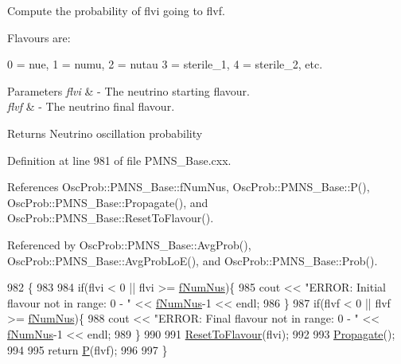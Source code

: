 Compute the probability of flvi going to flvf.

Flavours are\+: 
\begin{DoxyPre}
  0 = nue, 1 = numu, 2 = nutau
  3 = sterile\_1, 4 = sterile\_2, etc.
\end{DoxyPre}
 
\begin{DoxyParams}{Parameters}
{\em flvi} & -\/ The neutrino starting flavour. \\
\hline
{\em flvf} & -\/ The neutrino final flavour.\\
\hline
\end{DoxyParams}
\begin{DoxyReturn}{Returns}
Neutrino oscillation probability 
\end{DoxyReturn}


Definition at line 981 of file P\+M\+N\+S\+\_\+\+Base.\+cxx.



References Osc\+Prob\+::\+P\+M\+N\+S\+\_\+\+Base\+::f\+Num\+Nus, Osc\+Prob\+::\+P\+M\+N\+S\+\_\+\+Base\+::\+P(), Osc\+Prob\+::\+P\+M\+N\+S\+\_\+\+Base\+::\+Propagate(), and Osc\+Prob\+::\+P\+M\+N\+S\+\_\+\+Base\+::\+Reset\+To\+Flavour().



Referenced by Osc\+Prob\+::\+P\+M\+N\+S\+\_\+\+Base\+::\+Avg\+Prob(), Osc\+Prob\+::\+P\+M\+N\+S\+\_\+\+Base\+::\+Avg\+Prob\+Lo\+E(), and Osc\+Prob\+::\+P\+M\+N\+S\+\_\+\+Base\+::\+Prob().


\begin{DoxyCode}
982 \{
983 
984   \textcolor{keywordflow}{if}(flvi < 0 || flvi >= \hyperlink{classOscProb_1_1PMNS__Base_a24bb74bed63569dfe88b18fa6a08060e}{fNumNus})\{
985     cout << \textcolor{stringliteral}{"ERROR: Initial flavour not in range: 0 - "} << \hyperlink{classOscProb_1_1PMNS__Base_a24bb74bed63569dfe88b18fa6a08060e}{fNumNus}-1 << endl;
986   \}
987   \textcolor{keywordflow}{if}(flvf < 0 || flvf >= \hyperlink{classOscProb_1_1PMNS__Base_a24bb74bed63569dfe88b18fa6a08060e}{fNumNus})\{
988     cout << \textcolor{stringliteral}{"ERROR: Final flavour not in range: 0 - "} << \hyperlink{classOscProb_1_1PMNS__Base_a24bb74bed63569dfe88b18fa6a08060e}{fNumNus}-1 << endl;
989   \}
990 
991   \hyperlink{classOscProb_1_1PMNS__Base_ac0d4bf8ff1318ef96d3dafa62e0cec25}{ResetToFlavour}(flvi);
992 
993   \hyperlink{classOscProb_1_1PMNS__Base_a054e3a8b05b9a958b6fa416e4a835e3e}{Propagate}();
994 
995   \textcolor{keywordflow}{return} \hyperlink{classOscProb_1_1PMNS__Base_a0dc4d45bc3d7e03b9abbf5b4e100cc22}{P}(flvf);
996 
997 \}
\end{DoxyCode}
\mbox{\label{classOscProb_1_1PMNS__Base_aa3cee10639d5c0879ccb9e78d62128d3}} 
